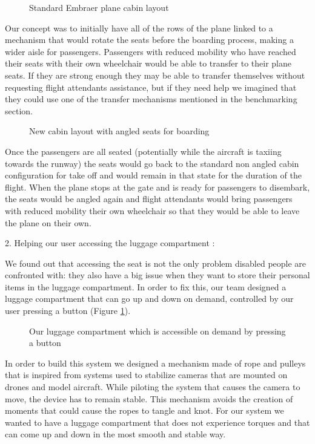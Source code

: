\begin{figure}[h]
  \centering
   \caption{Standard Embraer plane cabin layout}
  \label{fig:embraer_plane}
\end{figure}

Our concept was to initially have all of the rows of the plane linked to a mechanism that would rotate the seats before the boarding process, making a wider aisle for passengers. Passengers with reduced mobility who have reached their seats with their own wheelchair would be able to transfer to their plane seats. If they are strong enough they may be able to transfer themselves without requesting flight attendants assistance, but if they need help we imagined that they could use one of the transfer mechanisms mentioned in the benchmarking section.
\begin{figure}[h]
  \centering
   \caption{New cabin layout with angled seats for boarding}
  \label{fig:angled_seats}
\end{figure}

Once the passengers are all seated (potentially while the aircraft is taxiing towards the runway) the seats would go back to the standard non angled cabin configuration for take off and would remain in that state for the duration of the flight. When the plane stops at the gate and is ready for passengers to disembark, the seats would be angled again and flight attendants would bring passengers with reduced mobility their own wheelchair so that they would be able to leave the plane on their own. 

2. Helping our user accessing the luggage compartment :

We found out that accessing the seat is not the only problem disabled people are confronted with: they also have a big issue when they want to store their personal items in the luggage compartment. In order to fix this, our team designed a luggage compartment that can go up and down on demand, controlled by our user pressing a button (Figure \ref{fig:embraer_plane}).

\begin{figure}[h]
  \centering
   \caption{Our luggage compartment which is accessible on demand by pressing a button}
  \label{fig:our_luggage_compartment}
\end{figure}

In order to build this system we designed a mechanism made of rope and pulleys that is inspired from systems used to stabilize cameras that are mounted on drones and model aircraft. While piloting the system that causes the camera to move, the device has to remain stable. This mechanism avoids the creation of moments that could cause the ropes to tangle and knot. For our system we wanted to have a luggage compartment that does not experience torques and that can come up and down in the most smooth and stable way.

